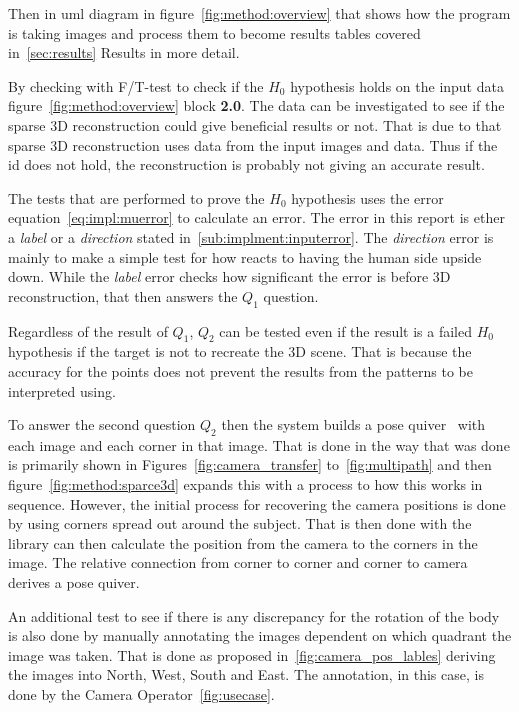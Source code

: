 Then in \ac{uml} diagram in figure~\ref{fig:method:overview} that shows how the program is taking images and process them to become results tables covered in~\ref{sec:results} Results in more detail.

By checking with F/T-test to check if the $H_0$ hypothesis holds on the input data figure~\ref{fig:method:overview} block \textbf{2.0}.
The data can be investigated to see if the sparse 3D reconstruction could give beneficial results or not.
That is due to that sparse 3D reconstruction uses data from the input images and data.
Thus if the id does not hold, the reconstruction is probably not giving an accurate result.

The tests that are performed to prove the $H_0$ hypothesis uses the error equation~\ref{eq:impl:muerror} to calculate an error.
The error in this report is ether a \textit{label} or a \textit{direction} stated in~\ref{sub:implment:inputerror}.
The \textit{direction} error is mainly to make a simple test for how \openpose{ } reacts to having the human side upside down.
While the \textit{label} error checks how significant the error is before 3D reconstruction, that then answers the $Q_1$ question.

Regardless of the result of $Q_1$, $Q_2$  can be tested even if the result is a failed $H_0$ hypothesis if the target is not to recreate the 3D scene.
That is because the accuracy for the points does not prevent the results from the \arcuo{ } patterns to be interpreted using.

To answer the second question $Q_2$ then the system builds a pose quiver~\cite{munoz2018mapping} with each image and each corner in that image.
That is done in the way that was done is primarily shown in Figures~\ref{fig:camera_transfer} to~\ref{fig:multipath} and then figure~\ref{fig:method:sparce3d} expands this with a process to how this works in sequence.
However, the initial process for recovering the camera positions is done by using \aruco{ } corners spread out around the subject.
That is then done with the \aruco{ } library can then calculate the position from the camera to the \acuro{ } corners in the image.
The relative connection from corner to corner and corner to camera derives a pose quiver.

An additional test to see if there is any discrepancy for the rotation of the body is also done by manually annotating the images dependent on which quadrant
the image was taken.
That is done as proposed in~\ref{fig:camera_pos_lables} deriving the images into North, West, South and East.
The annotation, in this case, is done by the Camera Operator~\ref{fig:usecase}.


